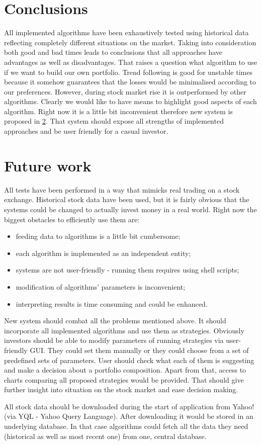 \section{Conclusions}

All implemented algorithms have been exhaustively tested using historical data reflecting completely different situations on the market.
Taking into consideration both good and bad times leads to conclusions that all approaches have advantages as well as disadvantages.
That raises a question what algorithm to use if we want to build our own portfolio.
Trend following is good for unstable times because it somehow guarantees that the losses would be minimalised according to our preferences.
However, during stock market rise it is outperformed by other algorithms.
Clearly we would like to have means to highlight good aspects of each algorithm.  
Right now it is a little bit inconvenient therefore new system is proposed in \ref{sec:future}.
That system should expose all strengths of implemented approaches and be user friendly for a casual investor. 


\section{Future work}
\label{sec:future}

All tests have been performed in a way that mimicks real trading on a stock exchange.
Historical stock data have been used, but it is fairly obvious that the systems could be changed to actually invest money in a real world.
Right now the biggest obstacles to efficiently use them are:

\begin{itemize}
  \item feeding data to algorithms is a little bit cumbersome;
  \item each algorithm is implemented as an independent entity;
  \item systems are not user-friendly - running them requires using shell scripts;
  \item modification of algorithms' parameters is inconvenient;
  \item interpreting results is time consuming and could be enhanced.
\end{itemize}
 
New system should combat all the problems mentioned above.
It should incorporate all implemented algorithms and use them as strategies.
Obviously investors should be able to modify parameters of running strategies via user-friendly GUI.
They could set them manually or they could choose from a set of predefined sets of parameters.
User should check what each of them is suggesting and make a decision about a portfolio composition.
Apart from that, access to charts comparing all proposed strategies would be provided.
That should give further insight into situation on the stock market and ease decision making.

All stock data should be downloaded during the start of application from Yahoo! (via YQL - Yahoo Query Language).
After downloading it would be stored in an underlying database.
In that case algorithms could fetch all the data they need (historical as well as most recent one) from one, central database.
 
